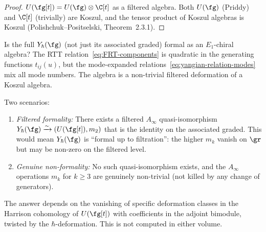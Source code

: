 \begin{proof}
$U(\fg[t]) = U(\fg) \otimes \C[t]$ as a filtered algebra.
Both $U(\fg)$ (Priddy) and $\C[t]$ (trivially) are Koszul, and
the tensor product of Koszul algebras is Koszul
(Polishchuk--Positselski, Theorem~2.3.1).
\end{proof}

\begin{question}
\label{q:yangian-Ainfty}
Is the full $Y_\hbar(\fg)$ (not just its associated graded)
formal as an $E_1$-chiral algebra? The RTT
relation~\eqref{eq:FRT-components} is quadratic in the
generating functions $t_{ij}(u)$, but the mode-expanded
relations~\eqref{eq:yangian-relation-modes} mix all mode
numbers. The algebra is a non-trivial filtered deformation
of a Koszul algebra.

Two scenarios:
\begin{enumerate}[label=\textup{(\alph*)}]
\item \emph{Filtered formality:}
 There exists a filtered $A_\infty$ quasi-isomorphism
 $Y_\hbar(\fg) \xrightarrow{\sim} (U(\fg[t]), m_2)$
 that is the identity on the associated graded. This would
 mean $Y_\hbar(\fg)$ is ``formal up to filtration'': the
 higher $m_k$ vanish on $\gr$ but may be non-zero on the
 filtered level.
\item \emph{Genuine non-formality:}
 No such quasi-isomorphism exists, and the $A_\infty$
 operations $m_k$ for $k \ge 3$ are genuinely non-trivial
 (not killed by any change of generators).
\end{enumerate}
The answer depends on the vanishing of specific deformation
classes in the Harrison cohomology of $U(\fg[t])$ with
coefficients in the adjoint bimodule, twisted by the
$\hbar$-deformation. This is not computed in either volume.
\end{question}

